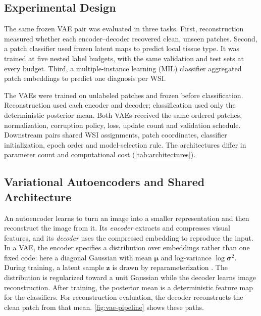 \documentclass[conference,a4paper]{IEEEtran}
\begin{document}
\subsection{Experimental Design}

The same frozen VAE pair was evaluated in three tasks. First, reconstruction
measured whether each encoder--decoder recovered clean, unseen patches.
Second, a patch classifier used frozen latent maps to predict local tissue
type. It was trained at five nested label budgets, with the same validation
and test sets at every budget. Third, a multiple-instance learning (MIL)
classifier aggregated patch embeddings to predict one diagnosis per WSI.

The VAEs were trained on unlabeled patches and frozen before classification.
Reconstruction used each encoder and decoder; classification used only the
deterministic posterior mean. Both VAEs received the same ordered patches,
normalization, corruption policy, loss, update count and validation schedule.
Downstream pairs shared WSI assignments, patch coordinates, classifier
initialization, epoch order and model-selection rule. The architectures differ
in parameter count and computational cost (\autoref{tab:architectures}).

\subsection{Variational Autoencoders and Shared Architecture}

An autoencoder learns to turn an image into a smaller representation and then
reconstruct the image from it. Its \emph{encoder} extracts and compresses visual
features, and its \emph{decoder} uses the compressed embedding to reproduce
the input. In a VAE, the encoder specifies a distribution over embeddings
rather than one fixed code: here a diagonal Gaussian with mean
$\boldsymbol{\mu}$ and log-variance $\log\boldsymbol{\sigma}^2$. During
training, a latent sample $\mathbf{z}$ is drawn by reparameterization
\cite{kingma_auto_encoding_2014}. The distribution is regularized toward a
unit Gaussian while the decoder learns image reconstruction. After training,
the posterior mean is a deterministic feature map for the classifiers. For
reconstruction evaluation, the decoder reconstructs the clean patch from
that mean. \autoref{fig:vae-pipeline} shows these paths.
\end{document}
